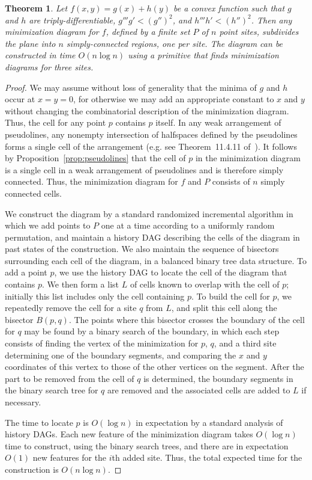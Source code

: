 \documentclass[10pt, conference, compsocconf]{IEEEtran}
\newtheorem{theorem}{Theorem}
\begin{document}
\begin{theorem}
\label{thm:voronoi}
Let $f(x,y)=g(x)+h(y)$ be a convex function such that $g$ and $h$ are triply-differentiable, $g'''g'<(g'')^2$, and $h'''h'<(h'')^2$. Then any minimization diagram for $f$, defined by a finite set $P$ of $n$ point sites, subdivides the plane into $n$ simply-connected regions, one per site. The diagram can be constructed in time $O(n\log n)$ using a primitive that finds minimization diagrams for three sites.
\end{theorem}

\begin{proof}
We may assume without loss of generality that the minima of $g$ and $h$ occur at $x=y=0$, for otherwise we may add an appropriate constant to $x$ and $y$ without changing the combinatorial description of the minimization diagram. Thus, the cell for any point $p$ contains $p$ itself. In any weak arrangement of pseudolines, any nonempty intersection of halfspaces defined by the pseudolines forms a single cell of the arrangement (e.g. see Theorem~11.4.11 of~\cite{EppFalOvc-07}).
It follows by Proposition~\ref{prop:pseudolines} that the cell of $p$ in the minimization diagram is a single cell in a weak arrangement of pseudolines and is therefore simply connected. Thus, the minimization diagram for $f$ and $P$ consists of $n$ simply connected cells.

We construct the diagram by a standard randomized incremental algorithm in which we add points to $P$ one at a time according to a uniformly random permutation, and maintain a history DAG describing the cells of the diagram in past states of the construction. We also maintain the sequence of bisectors surrounding each cell of the diagram, in a balanced binary tree data structure. To add a point $p$, we use the history DAG to locate the cell of the diagram that contains $p$. We then form a list $L$ of cells known to overlap with the cell of $p$; initially this list includes only the cell containing $p$. To build the cell for $p$, we repeatedly remove the cell for a site $q$ from $L$, and split this cell along the bisector $B(p,q)$. The points where this bisector crosses the boundary of the cell for $q$ may be found by a binary search of the boundary, in which each step consists of finding the vertex of the minimization for $p$, $q$, and a third site determining one of the boundary segments, and comparing the $x$ and $y$ coordinates of this vertex to those of the other vertices on the segment. After the part to be removed from the cell of $q$ is determined, the boundary segments in the binary search tree for $q$ are removed and the associated cells are added to $L$ if necessary.

The time to locate $p$ is $O(\log n)$ in expectation by a standard analysis of history DAGs.
Each new feature of the minimization diagram takes $O(\log n)$ time to construct, using the binary search trees, and there are in expectation $O(1)$ new features for the $i$th added site. Thus, the total expected time for the construction is $O(n\log n)$.
\end{proof}
\end{document}
